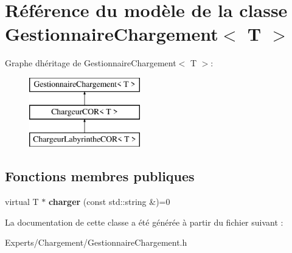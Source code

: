 \hypertarget{class_gestionnaire_chargement}{}\section{Référence du modèle de la classe Gestionnaire\+Chargement$<$ T $>$}
\label{class_gestionnaire_chargement}
Graphe d\textquotesingle{}héritage de Gestionnaire\+Chargement$<$ T $>$\+:\begin{figure}[H]
\begin{center}
\leavevmode
\includegraphics[height=3.000000cm]{class_gestionnaire_chargement}
\end{center}
\end{figure}
\subsection*{Fonctions membres publiques}
\begin{DoxyCompactItemize}
\item 
\mbox{\label{class_gestionnaire_chargement_ae530e689d1061a027903db5cd950ea73}} 
virtual T $\ast$ {\bfseries charger} (const std\+::string \&)=0
\end{DoxyCompactItemize}


La documentation de cette classe a été générée à partir du fichier suivant \+:\begin{DoxyCompactItemize}
\item 
Experts/\+Chargement/Gestionnaire\+Chargement.\+h\end{DoxyCompactItemize}
